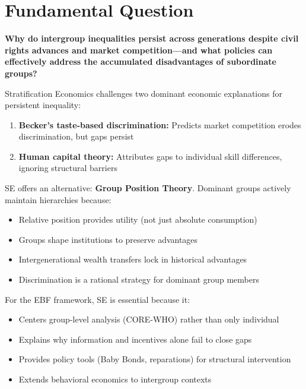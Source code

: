 \section{Fundamental Question}
\label{sec:se-fundamental}

\begin{tcolorbox}[colback=red!5!white,colframe=red!75!black,title=Fundamental Question]
\textbf{Why do intergroup inequalities persist across generations despite civil rights advances and market competition---and what policies can effectively address the accumulated disadvantages of subordinate groups?}
\end{tcolorbox}

Stratification Economics challenges two dominant economic explanations for persistent inequality:

\begin{enumerate}
    \item \textbf{Becker's taste-based discrimination:} Predicts market competition erodes discrimination, but gaps persist
    \item \textbf{Human capital theory:} Attributes gaps to individual skill differences, ignoring structural barriers
\end{enumerate}

SE offers an alternative: \textbf{Group Position Theory}. Dominant groups actively maintain hierarchies because:
\begin{itemize}
    \item Relative position provides utility (not just absolute consumption)
    \item Groups shape institutions to preserve advantages
    \item Intergenerational wealth transfers lock in historical advantages
    \item Discrimination is a rational strategy for dominant group members
\end{itemize}

For the EBF framework, SE is essential because it:
\begin{itemize}
    \item Centers group-level analysis (CORE-WHO) rather than only individual
    \item Explains why information and incentives alone fail to close gaps
    \item Provides policy tools (Baby Bonds, reparations) for structural intervention
    \item Extends behavioral economics to intergroup contexts
\end{itemize}

